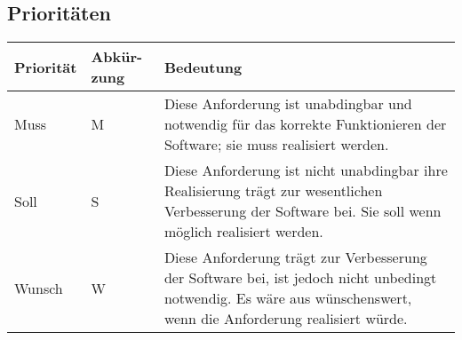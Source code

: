 \subsection{Prioritäten}

\begin{tabular}{| p{3cm} | p{2cm} | p{10cm} |}


\hline
\textbf{Priorität} & 
\textbf{Abkür-} \newline \textbf{zung} & 
\textbf{Bedeutung} \\
\hline

Muss & 
M & 
Diese Anforderung ist unabdingbar und notwendig für das korrekte Funktionieren der Software; sie muss realisiert werden. \\
\hline

Soll &
S &
Diese Anforderung ist nicht unabdingbar ihre Realisierung trägt zur wesentlichen Verbesserung der Software bei. Sie soll wenn möglich realisiert werden. \\
\hline

Wunsch &
W &
Diese Anforderung trägt zur Verbesserung der Software bei, ist jedoch nicht unbedingt notwendig. Es wäre aus wünschenswert, wenn die Anforderung realisiert würde. \\
\hline

\end{tabular}

